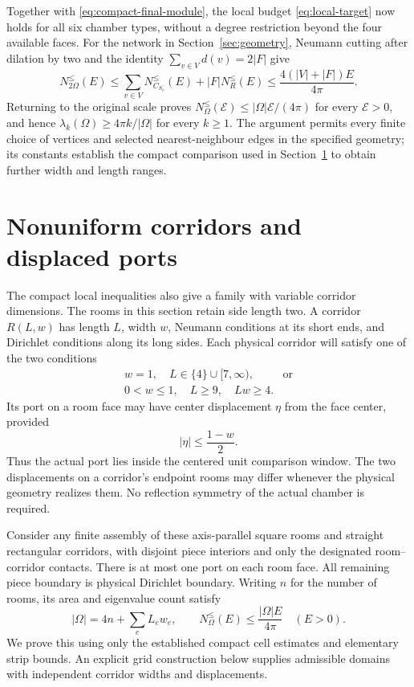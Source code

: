 \documentclass[11pt,reqno]{amsart}
\numberwithin{equation}{section}
\newcommand{\abs}[1]{\lvert#1\rvert}
\begin{document}
Together with \eqref{eq:compact-final-module}, the local budget
\eqref{eq:local-target} now holds for all six chamber types, without
a degree restriction beyond the four available faces. For the
network in Section~\ref{sec:geometry}, Neumann cutting after dilation
by two and the identity $\sum_{v\in V}d(v)=2\abs F$ give
\[
 N_{2\Omega}^{\le}(E)
 \le\sum_{v\in V}N_{C_{S_v}}^{\le}(E)+\abs F N_R^{\le}(E)
 \le\frac{4(\abs V+\abs F)E}{4\pi}.
\]
Returning to the original scale proves
$N_\Omega^{\le}(\mathcal E)\le
\abs\Omega\mathcal E/(4\pi)$ for every $\mathcal E>0$, and hence
$\lambda_k(\Omega)\ge4\pi k/\abs\Omega$ for every $k\ge1$.
The argument permits every finite choice of vertices and selected
nearest-neighbour edges in the specified geometry; its constants
establish the compact comparison used in
Section~\ref{sec:nonuniform} to obtain further width and length ranges.

\section{Nonuniform corridors and displaced ports}
\label{sec:nonuniform}

The compact local inequalities also give a family with variable corridor
dimensions. The rooms in this section retain side length two. A corridor
$R(L,w)$ has length $L$, width $w$, Neumann conditions at its short ends,
and Dirichlet conditions along its long sides. Each physical corridor
will satisfy one of the two conditions
\begin{equation}
 \begin{array}{ll}
 w=1,\quad L\in\{4\}\cup[7,\infty), &\text{or}\\[2pt]
 0<w\le1,\quad L\ge9,\quad Lw\ge4.
 \end{array}
 \label{nu:edge-ranges}
\end{equation}
Its port on a room face may have center displacement $\eta$ from the
face center, provided
\begin{equation}
 |\eta|\le\frac{1-w}{2}.
 \label{nu:port-envelope}
\end{equation}
Thus the actual port lies inside the centered unit comparison window.
The two displacements on a corridor's endpoint rooms may differ whenever
the physical geometry realizes them. No reflection symmetry of the
actual chamber is required.

Consider any finite assembly of these axis-parallel square rooms and
straight rectangular corridors, with disjoint piece interiors and only
the designated room--corridor contacts. There is at most one port on each
room face. All remaining piece boundary is physical Dirichlet boundary.
Writing $n$ for the number of rooms, its area and eigenvalue count satisfy
\begin{equation}
 |\Omega|=4n+\sum_e L_ew_e,\qquad
 N_\Omega^{\le}(E)\le\frac{|\Omega|E}{4\pi}
 \quad(E>0).
 \label{nu:global-result}
\end{equation}
We prove this using only the established compact cell estimates and
elementary strip bounds. An explicit grid construction below supplies
admissible domains with independent corridor widths and displacements.
\end{document}
